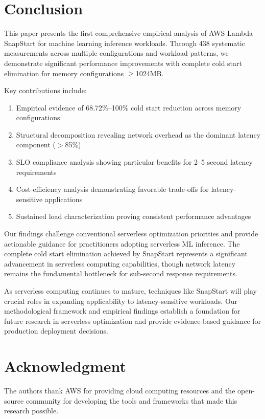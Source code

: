\documentclass[conference]{IEEEtran}
\begin{document}
\section{Conclusion}

This paper presents the first comprehensive empirical analysis of AWS Lambda SnapStart for machine learning inference workloads. Through 438 systematic measurements across multiple configurations and workload patterns, we demonstrate significant performance improvements with complete cold start elimination for memory configurations $\geq$1024MB.

Key contributions include:
\begin{enumerate}
\item Empirical evidence of 68.72\%--100\% cold start reduction across memory configurations
\item Structural decomposition revealing network overhead as the dominant latency component (\(>\)85\%)
\item SLO compliance analysis showing particular benefits for 2--5 second latency requirements
\item Cost-efficiency analysis demonstrating favorable trade-offs for latency-sensitive applications
\item Sustained load characterization proving consistent performance advantages
\end{enumerate}

Our findings challenge conventional serverless optimization priorities and provide actionable guidance for practitioners adopting serverless ML inference. The complete cold start elimination achieved by SnapStart represents a significant advancement in serverless computing capabilities, though network latency remains the fundamental bottleneck for sub-second response requirements.

As serverless computing continues to mature, techniques like SnapStart will play crucial roles in expanding applicability to latency-sensitive workloads. Our methodological framework and empirical findings establish a foundation for future research in serverless optimization and provide evidence-based guidance for production deployment decisions.


\section*{Acknowledgment}
The authors thank AWS for providing cloud computing resources and the open-source community for developing the tools and frameworks that made this research possible.
\end{document}
